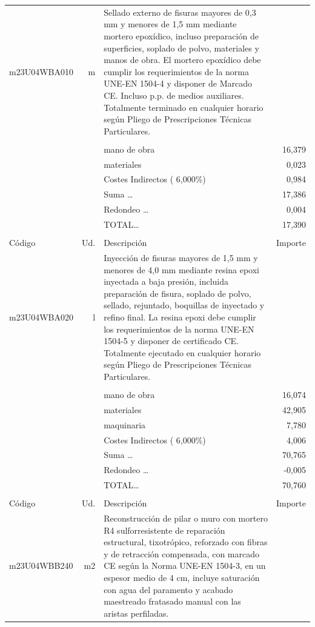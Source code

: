 \documentclass{book}%
\begin{document}
\begin{supertabular}{l r p{60mm} r}
\hline%
m23U04WBA010&m&Sellado externo de fisuras mayores de 0,3 mm y menores de 1,5 mm mediante mortero epoxídico, incluso preparación de superficies, soplado de polvo, materiales y manos de obra. El mortero epoxídico debe cumplir los requerimientos de la norma UNE{-}EN 1504{-}4 y disponer de Marcado CE. Incluso p.p. de medios auxiliares. Totalmente terminado en cualquier horario según Pliego de Prescripciones Técnicas Particulares.&\\%
&&&\\%
&&mano de obra&    16,379\\%
&&materiales&     0,023\\%
&&Costes Indirectos (     6,000\%)&     0,984\\%
&&Suma \ldots&    17,386\\%
&&Redondeo \ldots&     0,004\\%
%
&&TOTAL\ldots&    17,390\\%
&&&\\%
Código&Ud.&Descripción&Importe\\%
\hline%
m23U04WBA020&l&Inyección de fisuras mayores de 1,5 mm y menores de 4,0 mm mediante resina epoxi inyectada a baja presión, incluida preparación de fisura, soplado de polvo, sellado, rejuntado, boquillas de inyectado y refino final. La resina epoxi debe cumplir los requerimientos de la norma UNE{-}EN 1504{-}5 y disponer de certificado CE. Totalmente ejecutado en cualquier horario según Pliego de Prescripciones Técnicas Particulares.&\\%
&&&\\%
&&mano de obra&    16,074\\%
&&materiales&    42,905\\%
&&maquinaria&     7,780\\%
&&Costes Indirectos (     6,000\%)&     4,006\\%
&&Suma \ldots&    70,765\\%
&&Redondeo \ldots&    {-}0,005\\%
%
&&TOTAL\ldots&    70,760\\%
&&&\\%
Código&Ud.&Descripción&Importe\\%
\hline%
m23U04WBB240&m2&Reconstrucción de pilar o muro con mortero R4 sulforresistente de reparación estructural, tixotrópico, reforzado con fibras y de retracción compensada, con marcado CE según la Norma UNE{-}EN 1504{-}3, en un espesor medio de 4 cm, incluye saturación con agua del paramento y acabado maestreado fratasado manual con las aristas perfiladas.&\\%

\end{supertabular}
\end{document}

